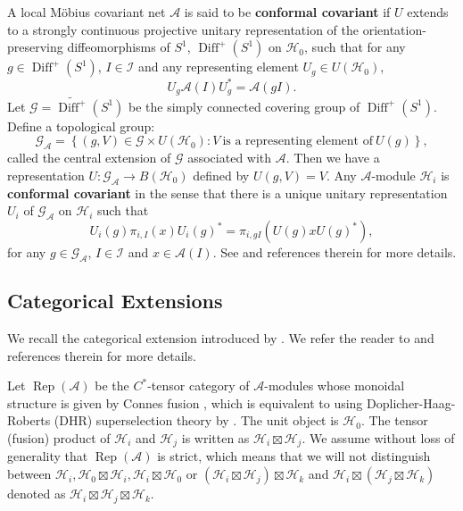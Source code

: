 \documentclass{article}
\newcommand{\hilb}{\mathcal{H}}
\newcommand{\A}{\mathcal{A}}
\begin{document}
A local M\"{o}bius covariant net $\A$ is said to be \textbf{conformal covariant} if 
$U$ extends to a strongly continuous projective unitary representation of the orientation-preserving diffeomorphisms of  $S^1$, 
$\operatorname{Diff}^+(S^1)$ on $\hilb_0$, such that for any $g\in \operatorname{Diff}^+(S^1)$, $I\in \mathcal{I}$ and any
representing element $U_g \in U(\hilb_0)$,
\[
U_g \A(I) U_g^* = \A(gI). 
\]
Let $\mathcal{G} = \widetilde{\operatorname{Diff}^+}(S^1)$ be  the simply connected covering group of ${\operatorname{Diff}^+}(S^1)$. Define a topological group:
\[
\mathcal{G}_\A =  \left\{(g,V)\in \mathcal{G} \times U(\hilb_0): V \ \text{is a representing element of} \ U(g)\right\},
\]
called the central extension of $\mathcal{G}$ associated with $\A$. 
Then we have a representation $U: \mathcal{G}_\A \to B(\hilb_0)$ defined by $U(g,V) = V$.  Any $\A$-module $\hilb_i$ is \textbf{ conformal covariant } in the sense that there is a unique unitary representation 
$U_i$ of $\mathcal{G}_\A$ on $\hilb_i$ such that 
\[U_i(g)\pi_{i,I}(x)U_i(g)^* = \pi_{i,gI}(U(g)xU(g)^*), \] for any $g\in\mathcal{G}_\A$, $I\in\mathcal{I}$ and $x\in\A(I)$. See \cite{henriques2019loop,gui2021categorical} and references therein for more details.

\subsection{Categorical Extensions}
We recall the categorical extension introduced by \cite{gui2021categorical}. We refer the reader to \cite{gui2021categorical,gui2021bisognano} and references therein for more details.

Let $\operatorname{Rep}(\A)$ be the $C^*$-tensor category of $\A$-modules whose monoidal structure is given by Connes fusion \cite{bartels2015conformal,bartels2017conformal,gui2021categorical}, which is equivalent to using Doplicher-Haag-Roberts (DHR) superselection theory \cite{fredenhagen1989superselection,fredenhagen1992superselection} by \cite[Chapter 6]{gui2021categorical}. The unit object 
is $\hilb_0$. The tensor (fusion) product of $\hilb_i$ and $\hilb_j$ is written as $\hilb_i \boxtimes \hilb_j$.  
We assume without loss of generality that
$\operatorname{Rep}(\A)$ is strict, which means that we will not distinguish between
$\hilb_i, \hilb_0 \boxtimes \hilb_i, \hilb_i \boxtimes \hilb_0$ or $(\hilb_i\boxtimes\hilb_j)\boxtimes\hilb_k$  and $\hilb_i\boxtimes(\hilb_j\boxtimes\hilb_k)$ denoted as $\hilb_i\boxtimes\hilb_j\boxtimes\hilb_k$. 
\end{document}
